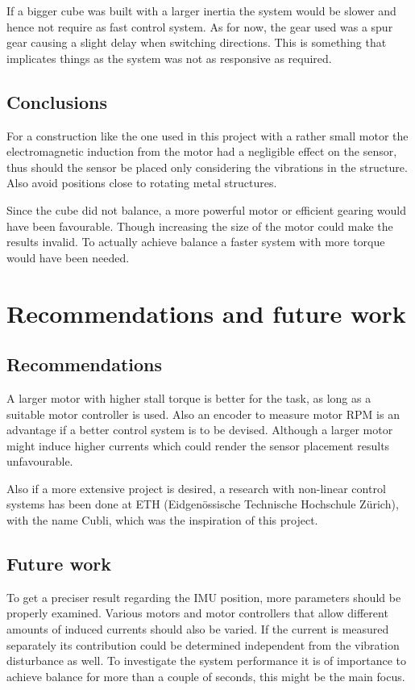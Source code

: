 \documentclass[a4paper,11pt]{kth-mag}
\begin{document}
If a bigger cube was built with a larger inertia the system would be slower and hence not require as fast control system. As for now, the gear used was a spur gear causing a slight delay when switching directions. This is something that implicates things as the system was not as responsive as required. 


\section{Conclusions}
For a construction like the one used in this project with a rather small motor the electromagnetic induction from the motor had a negligible effect on the sensor, thus should the sensor be placed only considering the vibrations in the structure. Also avoid positions close to rotating metal structures. 

Since the cube did not balance, a more powerful motor or efficient gearing would have been favourable. Though increasing the size of the motor could make the results invalid. To actually achieve balance a faster system with more torque would have been needed.


\chapter{Recommendations and future work}

\section{Recommendations}


A larger motor with higher stall torque is better for the task, as long as a suitable motor controller is used. Also an encoder to measure motor RPM is an advantage if a better control system is to be devised. Although a larger motor might induce higher currents which could render the sensor placement results unfavourable.

Also if a more extensive project is desired, a research with non-linear control systems has been done at ETH (Eidgenössische Technische Hochschule Zürich), with the name Cubli\cite{cubliECC13}, which was the inspiration of this project.

\section{Future work}
To get a preciser result regarding the IMU position, more parameters should be properly examined. Various motors and motor controllers that allow different amounts of induced currents should also be varied. If the current is measured separately its contribution could be determined independent from the vibration disturbance as well.
To investigate the system performance it is of importance to achieve balance for more than a couple of seconds, this might be the main focus.
\end{document}
